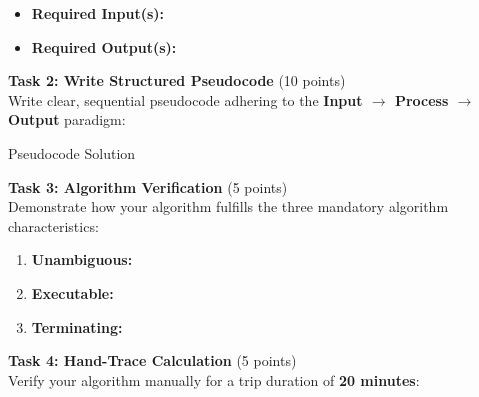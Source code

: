 \documentclass[11pt,a4paper]{article}
\begin{document}
\begin{itemize}[noitemsep]

  \item \textbf{Required Input(s):} \hrulefill \\[0.25cm]

  \item \textbf{Required Output(s):} \hrulefill

\end{itemize}

\vspace{0.08cm}

\noindent\textbf{Task 2: Write Structured Pseudocode} (10 points)\\

Write clear, sequential pseudocode adhering to the \textbf{Input $\rightarrow$ Process $\rightarrow$ Output} paradigm:

\begin{answerbox}[height=10.2cm]{Pseudocode Solution}

\vspace{0.03cm}

\end{answerbox}

\vspace{0.08cm}

\noindent\textbf{Task 3: Algorithm Verification} (5 points)\\

Demonstrate how your algorithm fulfills the three mandatory algorithm characteristics:

\begin{enumerate}[label=\alph*., noitemsep]

  \item \textbf{Unambiguous:} \hrulefill

  \item \textbf{Executable:} \hrulefill

  \item \textbf{Terminating:} \hrulefill

\end{enumerate}

\vspace{0.08cm}

\noindent\textbf{Task 4: Hand-Trace Calculation} (5 points)\\

Verify your algorithm manually for a trip duration of \textbf{20 minutes}:
\end{document}
